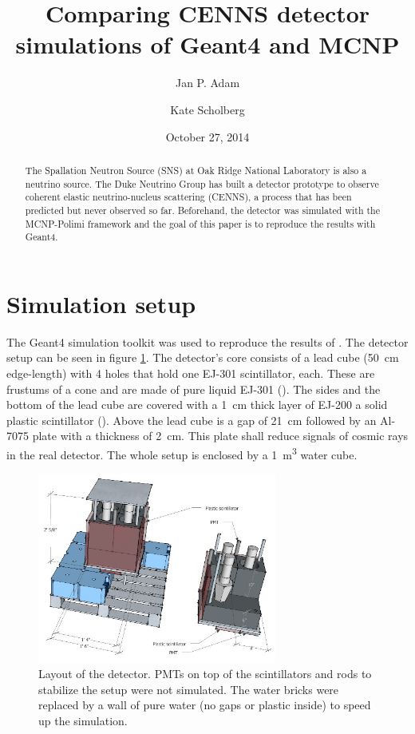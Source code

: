 \documentclass[12pt]{article}
\begin{document}
 

\title{Comparing CENNS detector simulations of Geant4 and MCNP} 

\author[1]{Jan P. Adam} 
\author[2]{Kate Scholberg} 
\date{October 27, 2014} 

\maketitle
\begin{abstract}
The Spallation Neutron Source (SNS) at Oak Ridge National Laboratory is also a neutrino source. The Duke Neutrino Group has built a detector prototype to observe coherent elastic neutrino-nucleus scattering (CENNS), a process that has been predicted but never observed so far. Beforehand, the detector was simulated with the MCNP-Polimi framework and the goal of this paper is to reproduce the results with Geant4.
\end{abstract}
\newpage

\section{Simulation setup}

The Geant4 simulation toolkit was used to reproduce the results of \cite{MCNP}. The detector setup can be seen in figure \ref{fig:detector}. The detector's core consists of a lead cube (\SI{50}{cm} edge-length) with 4 holes that hold one EJ-301 scintillator, each. These are frustums of a cone and are made of pure liquid EJ-301 (). The sides and the bottom of the lead cube are covered with a \SI{1}{cm} thick layer of EJ-200 a solid plastic scintillator (). Above the lead cube is a gap of \SI{21}{cm} followed by an Al-7075 plate with a thickness of \SI{2}{cm}. This plate shall reduce signals of cosmic rays in the real detector. The whole setup is enclosed by a \SI{1}{m^3} water cube.

\begin{figure}[htbp]
	\centering
	\includegraphics[width=0.7\textwidth]{./pics/Det2.jpg}
	\caption{Layout of the detector. PMTs on top of the scintillators and rods to stabilize the setup were not simulated. The water bricks were replaced by a wall of pure water (no gaps or plastic inside) to speed up the simulation. }
	\label{fig:detector}
\end{figure}
\end{document}
